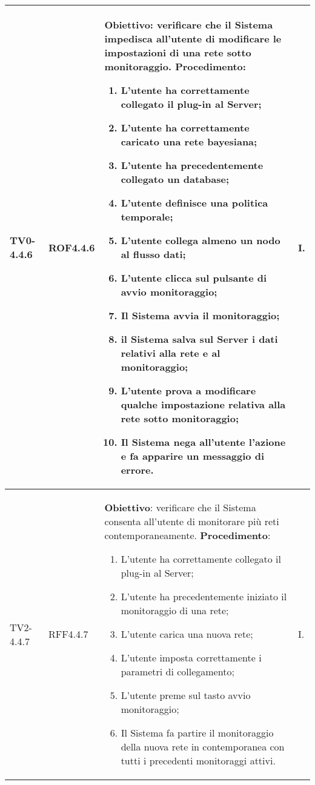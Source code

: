 \begin{longtable}{|C{.15\textwidth}|C{.13\textwidth}|m{.52\textwidth}|C{.08\textwidth}|}
TV0-4.4.6 & ROF4.4.6 &
	\textbf{Obiettivo}: verificare che il Sistema impedisca all'utente di modificare le impostazioni di una rete sotto monitoraggio. \newline
	\textbf{Procedimento}:
	\begin{enumerate}
		\item L'utente ha correttamente collegato il plug-in al Server;
		\item L'utente ha correttamente caricato una rete bayesiana;
		\item L'utente ha precedentemente collegato un database;
		\item L'utente definisce una politica temporale;
		\item L'utente collega almeno un nodo al flusso dati;
		\item L'utente clicca sul pulsante di avvio monitoraggio;							\item Il Sistema avvia il monitoraggio;
		\item il Sistema salva sul Server i dati relativi alla rete e al monitoraggio;
 		\item L'utente prova a modificare qualche impostazione relativa alla rete sotto monitoraggio;
 		\item Il Sistema nega all'utente l'azione e fa apparire un messaggio di errore.
	\end{enumerate}
	& I. \\
\hline

TV2-4.4.7 & RFF4.4.7 &
	\textbf{Obiettivo}: verificare che il Sistema consenta all'utente di monitorare più reti contemporaneamente. \newline
	\textbf{Procedimento}:
	\begin{enumerate}
		\item L'utente ha correttamente collegato il plug-in al Server;
		\item L'utente ha precedentemente iniziato il monitoraggio di una rete;
		\item L'utente carica una nuova rete;
		\item L'utente imposta correttamente i parametri di collegamento;
		\item L'utente preme sul tasto avvio monitoraggio;
		\item Il Sistema fa partire il monitoraggio della nuova rete in contemporanea con tutti i precedenti monitoraggi attivi.
	\end{enumerate}
	& I. \\
\hline


\end{longtable}
